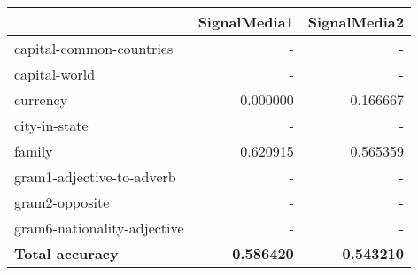 \begin{tabular}{lrr}
\toprule
{} &  SignalMedia1 &  SignalMedia2 \\
\midrule
capital-common-countries    &           - &           - \\
capital-world               &           - &           - \\
currency                    &      0.000000 &      0.166667 \\
city-in-state               &           - &           - \\
family                      &      0.620915 &      0.565359 \\
gram1-adjective-to-adverb   &           - &           - \\
gram2-opposite              &           - &           - \\
gram6-nationality-adjective &           - &           - \\
\textbf{Total accuracy}              &      \textbf{0.586420} &      \textbf{0.543210} \\
\bottomrule
\end{tabular}
